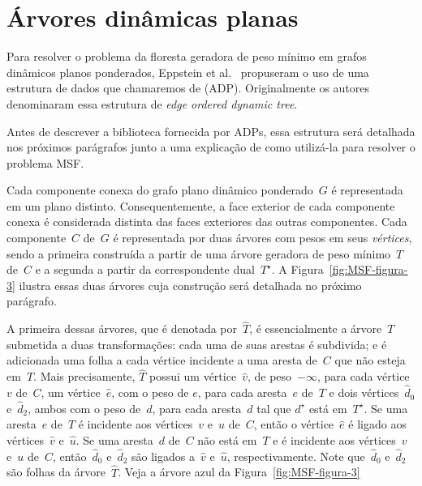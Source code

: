 \section{Árvores dinâmicas planas}
\label{sec:MSFcomADP}

Para resolver o problema da floresta geradora de peso mínimo em grafos dinâmicos planos ponderados, Eppstein et al.~\cite{EPPSTEIN-planar} propuseram o uso de uma estrutura de dados que chamaremos de  (ADP). Originalmente os autores denominaram essa estrutura de \textit{edge ordered dynamic tree}.


Antes de descrever a biblioteca fornecida por ADPs, essa estrutura será detalhada nos próximos parágrafos junto a uma explicação de como utilizá-la para resolver o problema MSF.

Cada componente conexa do grafo plano dinâmico ponderado~$G$ é representada em um plano distinto.
Consequentemente, a face exterior de cada componente conexa é considerada distinta das faces exteriores das outras componentes.
Cada componente~$C$ de~$G$ é representada por duas árvores com pesos em seus \textit{vértices}, sendo a primeira construída a partir de uma árvore geradora de peso mínimo~$T$ de~$C$ e a segunda a partir da correspondente dual~$T^\star$.
A Figura~\ref{fig:MSF-figura-3} ilustra essas duas árvores cuja construção será detalhada no próximo parágrafo.

A primeira dessas árvores, que é denotada por~$\hat T$, é essencialmente a árvore~$T$ submetida a duas transformações:
cada uma de suas arestas é subdivida; e é adicionada uma folha a cada vértice incidente a uma aresta de~$C$ que não esteja em~$T$.
Mais precisamente, $\hat T$ possui um vértice~$\hat v$, de peso~$-\infty$, para cada vértice~$v$ de~$C$, um vértice~$\hat e$, com o peso de $e$, para cada aresta~$e$ de~$T$ e dois vértices~$\hat d_0$ e~$\hat d_2$, ambos com o peso de~$d$, para cada aresta~$d$ tal que $d^\star$ está em~$T^\star$.
Se uma aresta~$e$ de~$T$ é incidente aos vértices~$v$ e~$u$ de~$C$, então o vértice~$\hat e$ é ligado aos vértices~$\hat v$ e~$\hat u$.
Se uma aresta~$d$ de~$C$ não está em~$T$ e é incidente aos vértices~$v$ e~$u$ de~$C$, então~$\hat d_0$ e~$\hat d_2$ são ligados a~$\hat v$ e~$\hat u$, respectivamente.
Note que~$\hat d_0$ e~$\hat d_2$ são folhas da árvore~$\hat T$.
Veja a árvore azul da Figura~\ref{fig:MSF-figura-3} 

